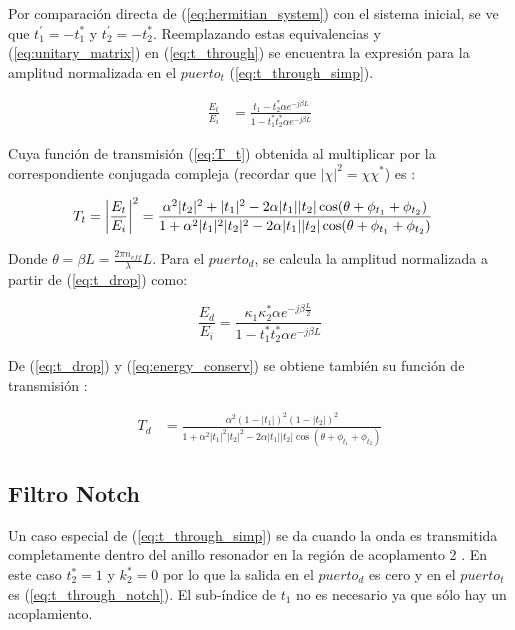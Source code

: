 Por comparación directa de (\ref{eq:hermitian_system}) con el sistema inicial, 
se ve que $t_1^{'} = -t_1^*$ y $t_2^{'} = -t_2^*$.
Reemplazando estas equivalencias y  
(\ref{eq:unitary_matrix}) en (\ref{eq:t_through}) se encuentra la
expresión para la amplitud normalizada en el $puerto_t$ (\ref{eq:t_through_simp}).

\begin{align}
\frac{E_t}{E_i} &= 
    \frac{t_1 - t_2^* \alpha e^{-j \beta L}}
    {1 - t_1^* t_2^* \alpha e^{-j \beta L}} \label{eq:t_through_simp}
\end{align} 

Cuya función de transmisión (\ref{eq:T_t}) obtenida al multiplicar
por la correspondiente conjugada compleja (recordar que $|\chi|^2 = \chi \chi^*$)
es \cite{paloczi2005polymer}:

\begin{align}
 T_t &= \abs*{\frac{E_t}{E_i}}^2 = 
    \frac{\alpha^2 |t_2|^2 + |t_1|^2 - 2\alpha |t_1||t_2| 
	\cos(\theta + \phi_{t_1} + \phi_{t_2}) }
    {1 + \alpha^2|t_1|^2 |t_2|^2 - 2\alpha |t_1||t_2|
	\cos(\theta + \phi_{t_1} + \phi_{t_2}) }
\label{eq:T_t}
\end{align} 

Donde $\theta = \beta L = \frac{2\pi n_{eff}}{\lambda} L$. Para el $puerto_d$, se calcula la amplitud normalizada a partir de (\ref{eq:t_drop}) como:

\begin{equation}
\frac{E_d}{E_i} = \frac{ \kappa_1 \kappa_2^* \alpha e^{ -j \beta \frac{L}{2}} }
	   { 1 - t_1^* t_2^* \alpha e^{-j \beta L} }
\label{eq:t_drop_simp}
\end{equation} 

De (\ref{eq:t_drop}) y (\ref{eq:energy_conserv}) se obtiene también su función de
transmisión \cite{abujnah2012numerical}:

\begin{align}
 T_d &= 
    \frac{\alpha^2 (1-|t_1|)^2 (1-|t_2|)^2}
    {1 + \alpha^2|t_1|^2 |t_2|^2 - 2\alpha |t_1||t_2|
	\cos(\theta + \phi_{t_1} + \phi_{t_2}) }
\label{eq:T_d}
\end{align} 

\subsection{Filtro Notch}
\label{ss:notch}

Un caso especial de (\ref{eq:t_through_simp}) se da cuando la onda es 
transmitida completamente dentro del anillo resonador en la región de acoplamento 2 \cite{yariv2006photonics}. 
En este caso $t_2^* = 1$ y $k_2^* = 0$ por lo que la salida en el $puerto_d$ es cero y
en el $puerto_t$ es (\ref{eq:t_through_notch}).
El sub-índice de $t_1$ no es necesario ya que sólo hay un acoplamiento.

